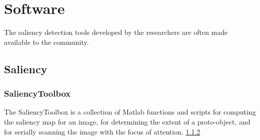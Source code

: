 \section{Software}
\label{sec:soft}

The saliency detection tools developed by the researchers are often made available to the community.

\subsection{Saliency}
\subsubsection{SaliencyToolbox}
The SaliencyToolbox is a collection of Matlab functions and scripts for computing the saliency map for an image, for determining the extent of a proto-object, and for serially scanning the image with the focus of attention. \ref{}

\subsubsection{}
